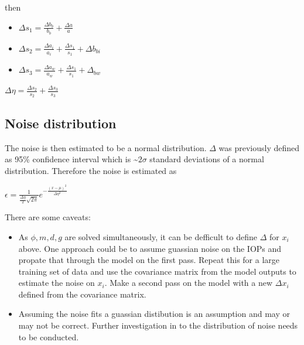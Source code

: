 \documentclass{article}
\begin{document}
then

\begin{itemize}
\itemsep1pt\parskip0pt
\item
  $\Delta s_1 = \frac{\Delta b_b}{b_b} + \frac{\Delta a}{a}$
\item
  $\Delta s_2 = \frac{\Delta a_i}{a_i} + \frac{\Delta s_1}{s_1} + \Delta b_{bi}$
\item
  $\Delta s_3 = \frac{\Delta a_w}{a_w} + \frac{\Delta s_1}{s_1} + \Delta_{bw}$
\end{itemize}

$\Delta \eta = \frac{\Delta s_2}{s_2} + \frac{\Delta s_3}{s_3}$

\subsection{}\label{section-1}

\subsection{Noise distribution}\label{noise-distribution}

The noise is then estimated to be a normal distribution. $\Delta$ was
previously defined as 95\% confidence interval which is
\textasciitilde{}$2\sigma$ standard deviations of a normal distribution.
Therefore the noise is estimated as

$\epsilon = \frac{1}{\frac{\Delta \eta}{2}\sqrt{2 \pi }} e^{-\frac{(x - \mu)^2}{\Delta \eta^2}}$

There are some caveats:

\begin{itemize}
\item
  As $\phi, m, d, g$ are solved simultaneously, it can be defficult to
  define $\Delta$ for $x_i$ above. One approach could be to assume
  guassian noise on the IOPs and propate that through the model on the
  first pass. Repeat this for a large training set of data and use the
  covariance matrix from the model outputs to estimate the noise on
  $x_i$. Make a second pass on the model with a new $\Delta x_i$ defined
  from the covariance matrix.
\item
  Assuming the noise fits a guassian distibution is an assumption and
  may or may not be correct. Further investigation in to the
  distribution of noise needs to be conducted.
\end{itemize}

    \subsection{}\label{section}
\end{document}
